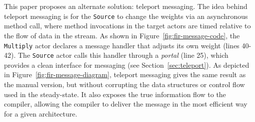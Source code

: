 This paper proposes an alternate solution: teleport messaging.  The
idea behind teleport messaging is for the {\tt Source} to change the
weights via an asynchronous method call, where method invocations in
the target actors are timed relative to the flow of data in the
stream.  As shown in Figure~\ref{fig:fir-message-code}, the {\tt
Multiply} actor declares a message handler that adjusts its own weight
(lines 40-42).  The {\tt Source} actor calls this handler through a
{\it portal} (line 25), which provides a clean interface for messaging
(see Section~\ref{sec:teleport}).  As depicted in
Figure~\ref{fig:fir-message-diagram}, teleport messaging gives the
same result as the manual version, but without corrupting the data
structures or control flow used in the steady-state.  It also exposes
the true information flow to the compiler, allowing the compiler to
deliver the message in the most efficient way for a given
architecture.

